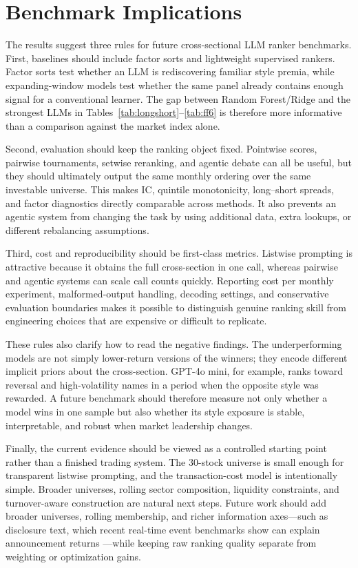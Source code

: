 \section{Benchmark Implications}

The results suggest three rules for future cross-sectional LLM ranker benchmarks.
First, baselines should include factor sorts and lightweight supervised rankers.
Factor sorts test whether an LLM is rediscovering familiar style premia, while expanding-window models test whether the same panel already contains enough signal for a conventional learner.
The gap between Random Forest/Ridge and the strongest LLMs in Tables~\ref{tab:longshort}--\ref{tab:ff6} is therefore more informative than a comparison against the market index alone.

Second, evaluation should keep the ranking object fixed.
Pointwise scores, pairwise tournaments, setwise reranking, and agentic debate can all be useful, but they should ultimately output the same monthly ordering over the same investable universe.
This makes IC, quintile monotonicity, long--short spreads, and factor diagnostics directly comparable across methods.
It also prevents an agentic system from changing the task by using additional data, extra lookups, or different rebalancing assumptions.

Third, cost and reproducibility should be first-class metrics.
Listwise prompting is attractive because it obtains the full cross-section in one call, whereas pairwise and agentic systems can scale call counts quickly.
Reporting cost per monthly experiment, malformed-output handling, decoding settings, and conservative evaluation boundaries makes it possible to distinguish genuine ranking skill from engineering choices that are expensive or difficult to replicate.

These rules also clarify how to read the negative findings.
The underperforming models are not simply lower-return versions of the winners; they encode different implicit priors about the cross-section.
GPT-4o mini, for example, ranks toward reversal and high-volatility names in a period when the opposite style was rewarded.
A future benchmark should therefore measure not only whether a model wins in one sample but also whether its style exposure is stable, interpretable, and robust when market leadership changes.

Finally, the current evidence should be viewed as a controlled starting point rather than a finished trading system.
The 30-stock universe is small enough for transparent listwise prompting, and the transaction-cost model is intentionally simple.
Broader universes, rolling sector composition, liquidity constraints, and turnover-aware construction are natural next steps.
Future work should add broader universes, rolling membership, and richer information axes---such as disclosure text, which recent real-time event benchmarks show can explain announcement returns \citep{koijen2026agentic}---while keeping raw ranking quality separate from weighting or optimization gains.

